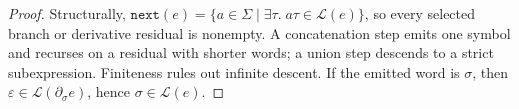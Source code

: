 \documentclass[popl.tex]{subfiles}
\begin{document}
\begin{proof}
  Structurally, \(\texttt{next}(e)=\{a\in \Sigma\mid\exists\tau.\;a\tau\in\mathcal{L}(e)\}\), so every selected branch or derivative residual is nonempty.  A concatenation step emits one symbol and recurses on a residual with shorter words; a union step descends to a strict subexpression. Finiteness rules out infinite descent. If the emitted word is \(\sigma\), then \(\varepsilon\in\mathcal{L}(\partial_\sigma e)\), hence \(\sigma\in\mathcal{L}(e)\).
\end{proof}
\ifSubfilesClassLoaded{\par\clearpage}{}
\end{document}
